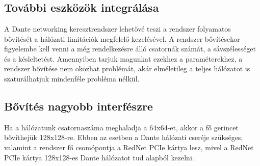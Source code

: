\chapter{\FurtherDevelopment}

\section{További eszközök integrálása}

A Dante networking keresztrendszer lehetővé teszi a rendszer folyamatos bővítését a
hálózati limitációk megfelelő kezelésével. A rendszer bővítésekor figyelembe kell venni a
még rendelkezésre álló csatornák számát, a sávszélességet és a késleltetést. Amennyiben
tarjuk magunkat ezekhez a paraméterekhez, a rendszer bővítése nem okozhat problémát, akár
elméletileg a teljes hálózatot is szaturálhatjuk mindenféle probléma nélkül.




\section{Bővítés nagyobb interfészre}

Ha a hálózatunk csatornaszáma meghaladja a 64x64-et, akkor a fő gerincet 
bővíthejük 128x128-re. Ebben az esetben a Dante hálózati cseréje szükséges,
valamint a rendszer fő csomópontja a RedNet PCIe kártya lesz, mivel 
a RedNet PCIe kártya 128x128-es Dante hálózatot tud alapból kezelni.